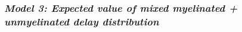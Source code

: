 \subsubsection*{\textit{Model 3: Expected value of mixed myelinated + unmyelinated delay distribution}}








